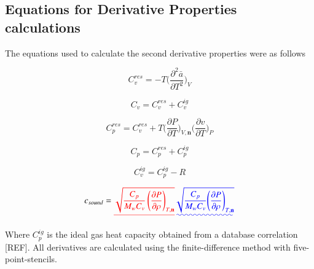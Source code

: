 \documentclass[preprint,12pt,3p]{elsarticle}
\providecommand{\DIFadd}[1]{{\protect\color{blue}\uwave{#1}}} %
\providecommand{\DIFdel}[1]{{\protect\color{red}\sout{#1}}}                      %
\providecommand{\DIFaddbegin}{} %
\providecommand{\DIFaddend}{} %
\providecommand{\DIFdelbegin}{} %
\providecommand{\DIFdelend}{} %
\begin{document}
\begin{appendices}
\setcounter{equation}{0}
\section{Equations for Derivative Properties calculations}

	The equations used to calculate the second derivative properties were as follows

\begin{equation} \label{eq:Cvres_deriv}
	C_{v}^{res} = -T\DIFdelbegin %
\DIFdelend \DIFaddbegin \Bigg(\DIFaddend \frac{\partial^{2}\bar{a}}{\partial T^{2}}\DIFdelbegin %
\DIFdelend \DIFaddbegin \Bigg)\DIFaddend _{V}
\end{equation}

\begin{equation} \label{eq:Cv_deriv}
	C_{v} = C_{v}^{res} + C_{v}^{ig}
\end{equation}

\begin{equation} \label{eq:Cpres_deriv}
	C_{p}^{res} = C_{v}^{res} + T \DIFdelbegin %
\DIFdelend \DIFaddbegin \Bigg(\DIFaddend \frac{\partial P}{\partial T}\DIFdelbegin %
\DIFdelend \DIFaddbegin \Bigg)\DIFaddend _{V,\textbf{n}} \DIFdelbegin %
\DIFdelend \DIFaddbegin \Bigg(\DIFaddend \frac{\partial v}{\partial T}\DIFdelbegin %
\DIFdelend \DIFaddbegin \Bigg)\DIFaddend _{P}
\end{equation}

\begin{equation} \label{eq:Cp_deriv}
	C_{p} = C_{p}^{res} + C_{p}^{ig}
\end{equation}

\begin{equation} \label{eq:Cvig_deriv}
	C_{v}^{ig} = C_{p}^{ig} - R
\end{equation}

\begin{equation} \label{eq:u_deriv}
	c_{sound} = \DIFdelbegin \DIFdel{\sqrt{\frac{C_{p}}{M_{w} C_{v}}\left(\frac{\partial P}{\partial \rho}\right)_{T,\textbf{n}}}
}\DIFdelend \DIFaddbegin \DIFadd{\sqrt{\frac{C_{p}}{M_{w} C_{v}}\Bigg(\frac{\partial P}{\partial \rho}\Bigg)_{T,\textbf{n}}}
}\DIFaddend \end{equation}

	Where $C_{p}^{ig}$ is the ideal gas heat capacity obtained from a database correlation [REF]. All derivatives are calculated using the finite-difference method with five-point-stencils.

\end{appendices}

%

\nocite{*}

\section*{\refname}


\end{document}
